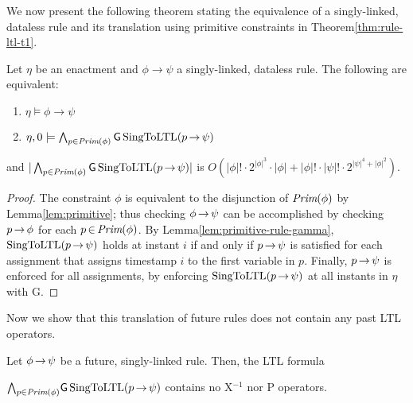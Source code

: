 \smallskip

We now present the following theorem stating
the equivalence of a singly-linked, dataless rule and 
its translation using primitive constraints in Theorem\:\ref{thm:rule-ltl-t1}.

\begin{thm}\label{thm:rule-ltl-t2}
  Let $\eta$ be an enactment and
  $\phi\rightarrow\psi$ a singly-linked, dataless rule.
  The following are equivalent:
  
  \begin{enumerate}
  \item
    $\eta \models \phi\rightarrow\psi$
  \item
    $\eta,0 \models \bigwedge_{p\in\textit{Prim}(\phi)}
    {\sf G}\,\text{SingToLTL}(p\,{\rightarrow}\,\psi)$
  \end{enumerate}
  and $|\bigwedge_{p\in\textit{Prim}(\phi)}
    {\sf G}\,\text{SingToLTL}(p\,{\rightarrow}\,\psi)|$ is
    $O(|\phi|! \cdot 2^{|\phi|^3}\cdot |\phi| + |\phi|! \cdot |\psi|! \cdot 2^{|\psi|^4+|\phi|^2})$.
\end{thm}

\begin{proof}
The constraint $\phi$
is equivalent to the disjunction of $\textit{Prim}(\phi)$
by Lemma\:\ref{lem:primitive};
thus checking $\phi\,{\rightarrow}\,\psi$
can be accomplished by checking $p\,{\rightarrow}\,\phi$
for each $p\,{\in}\,\textit{Prim}(\phi)$.
By Lemma\:\ref{lem:primitive-rule-gamma},
$\text{SingToLTL}(p\,{\rightarrow}\,\psi)$ holds at instant $i$
if and only if $p\,{\rightarrow}\,\psi$ is satisfied
for each assignment that assigns timestamp $i$
to the first variable in $p$.
Finally,
$p\,{\rightarrow}\,\psi$ is enforced for all assignments,
by enforcing $\text{SingToLTL}(p\,{\rightarrow}\,\psi)$ at all instants
in $\eta$ with {\sf G}.
\end{proof}

Now we show that this translation of future rules
does not contain any past LTL operators.

\begin{thm}\label{thm:futureRule}
  Let $\phi\,{\rightarrow}\,\psi$ be a future, singly-linked rule.
  Then, the LTL formula
  
  \noindent $\bigwedge_{p \in\textit{Prim}(\phi)}\!
  {\sf G}\,\text{SingToLTL}(p\,{\rightarrow}\,\psi)$
  contains no {\sf X}$^{-1}$ nor
  {\sf P} operators.
\end{thm}

